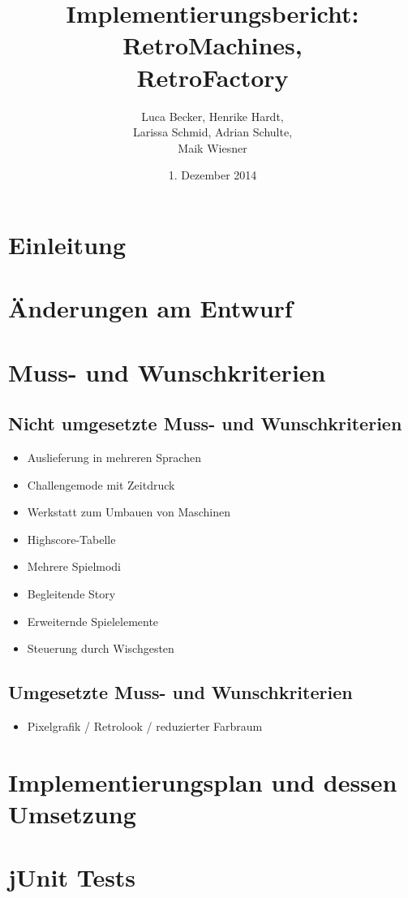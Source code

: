\documentclass{scrartcl}
\begin{document}
\title{Implementierungsbericht: RetroMachines, \\ RetroFactory}
\author{Luca Becker, Henrike Hardt,\\Larissa Schmid, Adrian Schulte,\\Maik Wiesner}
\date{1. Dezember 2014}
\maketitle
\thispagestyle{empty}

\clearpage

\thispagestyle{empty}
\tableofcontents
\thispagestyle{empty}

\clearpage
\setcounter{page}{1}

\section{Einleitung}

\section{Änderungen am Entwurf}

\section{Muss- und Wunschkriterien}

\subsection{Nicht umgesetzte Muss- und Wunschkriterien}

\begin{itemize}
	\item Auslieferung in mehreren Sprachen
	\item Challengemode mit Zeitdruck
	\item Werkstatt zum Umbauen von Maschinen
	\item Highscore-Tabelle
	\item Mehrere Spielmodi
	\item Begleitende Story
	\item Erweiternde Spielelemente
	\item Steuerung durch Wischgesten
\end{itemize}

\subsection{Umgesetzte Muss- und Wunschkriterien}

\begin{itemize}
	\item Pixelgrafik / Retrolook / reduzierter Farbraum
\end{itemize}

\section{Implementierungsplan und dessen Umsetzung}

\section{jUnit Tests}
\end{document}
